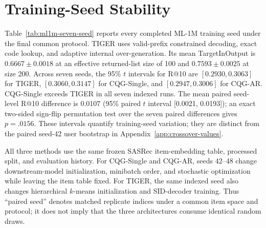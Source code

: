 \documentclass[letterpaper]{article}
\begin{document}
\section{Training-Seed Stability}
\label{app:seed-stability}

Table~\ref{tab:ml1m-seven-seed} reports every completed ML-1M training seed
under the final common protocol. TIGER uses valid-prefix constrained decoding,
exact code lookup, and adaptive internal over-generation. Its mean
TargetInOutput is \(0.6667\pm0.0018\) at an effective returned-list size of
100 and \(0.7593\pm0.0025\) at size 200. Across seven seeds, the 95\% $t$
intervals for R@10 are $[0.2930,0.3063]$ for TIGER,
$[0.3060,0.3147]$ for CQG-Single, and $[0.2947,0.3006]$ for CQG-AR.
CQG-Single exceeds TIGER in all seven indexed runs. The mean paired
seed-level R@10 difference is 0.0107 (95\% paired $t$ interval
[0.0021, 0.0193]); an exact two-sided sign-flip permutation test over the
seven paired differences gives $p=.0156$. These intervals quantify
training-seed variation; they are distinct from the paired seed-42 user
bootstrap in Appendix~\ref{app:crossover-values}.

All three methods use the same frozen SASRec item-embedding table, processed
split, and evaluation
history. For CQG-Single and CQG-AR, seeds 42--48 change downstream-model
initialization, minibatch order, and stochastic optimization while leaving the
item table fixed. For TIGER, the same indexed seed also changes hierarchical
$k$-means initialization and SID-decoder training. Thus ``paired seed''
denotes matched replicate indices under a common item space and protocol; it
does not imply that the three architectures consume identical random draws.
\end{document}
